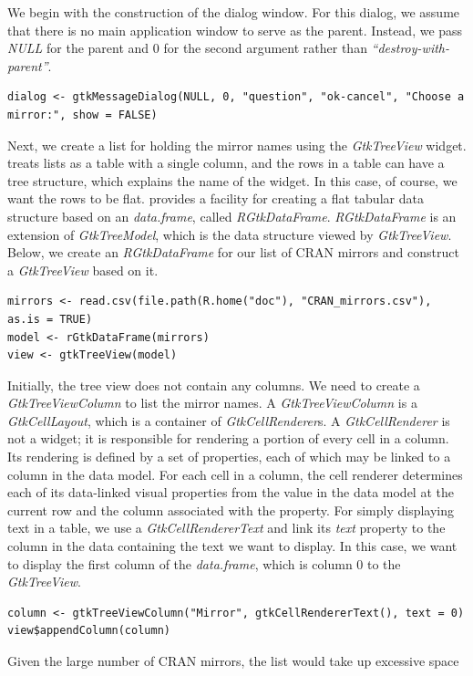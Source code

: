 \documentclass[article]{jss}
\begin{document}
We begin with the construction of the dialog window. For this dialog, we 
assume that there is no main application window to serve as the parent. 
Instead, we pass \emph{NULL} for the parent and $0$ for the second argument 
rather than \emph{``destroy-with-parent''}.
\begin{verbatim}
dialog <- gtkMessageDialog(NULL, 0, "question", "ok-cancel", "Choose a mirror:", show = FALSE)
\end{verbatim}
Next, we create a list for holding the mirror names using the \emph{GtkTreeView}
widget.  treats lists as a table with a single column, and the rows in
a table can have a tree structure, which explains the name of the widget.
In this case, of course, we want the rows to be flat.  provides a 
facility for creating a flat tabular data structure based on an 
\emph{data.frame}, called \emph{RGtkDataFrame}. \emph{RGtkDataFrame} is
an extension of \emph{GtkTreeModel}, which is the data structure viewed by
\emph{GtkTreeView}. Below, we create an \emph{RGtkDataFrame} for our list
of CRAN mirrors and construct a \emph{GtkTreeView} based on it.
\begin{verbatim}
mirrors <- read.csv(file.path(R.home("doc"), "CRAN_mirrors.csv"), as.is = TRUE)
model <- rGtkDataFrame(mirrors)
view <- gtkTreeView(model)
\end{verbatim}
Initially, the tree view does not contain any columns. We need to
create a \emph{GtkTreeViewColumn} to list the mirror names. A \emph{GtkTreeViewColumn}
is a \emph{GtkCellLayout}, which is a container of \emph{GtkCellRenderer}s. 
A \emph{GtkCellRenderer} is not a widget; it is responsible for rendering
a portion of every cell in a column. Its rendering is defined by a set of
properties, each of which may be linked to a column in the data model. For each
cell in a column, the cell renderer determines each of its data-linked visual
properties from the value in the data model at the current
row and the column associated with the property. For simply displaying
text in a table, we use a \emph{GtkCellRendererText} and link its \emph{text}
property to the column in the data containing the text we want to display.
In this case, we want to display the first column of the \emph{data.frame},
which is column $0$ to the \emph{GtkTreeView}.
\begin{verbatim}
column <- gtkTreeViewColumn("Mirror", gtkCellRendererText(), text = 0)
view$appendColumn(column)
\end{verbatim}
Given the large number of CRAN mirrors, the list would take up excessive space
\end{document}
